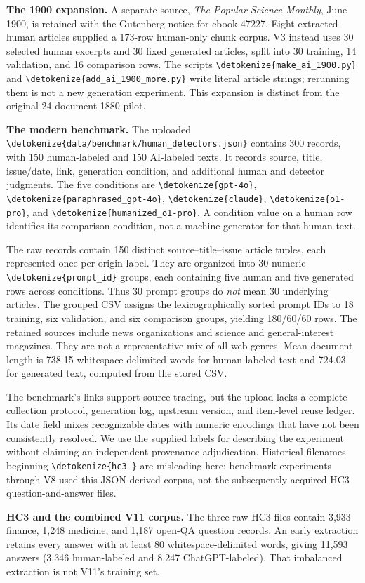 \documentclass[11pt]{article}
\newcommand{\code}[1]{\expandafter\nolinkurl\expandafter{\detokenize{#1}}}
\begin{document}
\textbf{The 1900 expansion.} A separate source, \emph{The Popular Science
Monthly}, June 1900, is retained with the Gutenberg notice for ebook 47227.
Eight extracted human articles supplied a 173-row human-only chunk corpus.
V3 instead uses 30 selected human excerpts and 30 fixed generated articles,
split into 30 training, 14 validation, and 16 comparison rows. The scripts
\code{make_ai_1900.py} and \code{add_ai_1900_more.py} write literal article
strings; rerunning them is not a new generation experiment. This expansion
is distinct from the original 24-document 1880 pilot.

\textbf{The modern benchmark.} The uploaded
\code{data/benchmark/human_detectors.json} contains 300 records, with 150
human-labeled and 150 AI-labeled texts. It records source, title, issue/date,
link, generation condition, and additional human and detector judgments.
The five conditions are \code{gpt-4o}, \code{paraphrased_gpt-4o},
\code{claude}, \code{o1-pro}, and \code{humanized_o1-pro}. A condition value
on a human row identifies its comparison condition, not a machine generator
for that human text.

The raw records contain 150 distinct source--title--issue article tuples,
each represented once per origin label. They are organized into 30 numeric
\code{prompt_id} groups, each containing five human and five generated rows
across conditions. Thus 30 prompt groups do \emph{not} mean 30 underlying
articles. The grouped CSV assigns the lexicographically sorted prompt IDs
to 18 training, six validation, and six comparison groups, yielding
180/60/60 rows. The retained sources include news organizations and science
and general-interest magazines. They are not a representative mix of all
web genres. Mean document length is 738.15 whitespace-delimited words for
human-labeled text and 724.03 for generated text, computed from the stored CSV.

The benchmark's links support source tracing, but the upload lacks a complete
collection protocol, generation log, upstream version, and item-level reuse
ledger. Its date field mixes recognizable dates with numeric encodings that
have not been consistently resolved. We use the supplied labels for describing
the experiment without claiming an independent provenance adjudication.
Historical filenames beginning \code{hc3_} are misleading here: benchmark
experiments through V8 used this JSON-derived corpus, not the subsequently
acquired HC3 question-and-answer files.

\textbf{HC3 and the combined V11 corpus.} The three raw HC3 files contain
3,933 finance, 1,248 medicine, and 1,187 open-QA question records. An early
extraction retains every answer with at least 80 whitespace-delimited words,
giving 11,593 answers (3,346 human-labeled and 8,247 ChatGPT-labeled). That
imbalanced extraction is not V11's training set.
\end{document}
